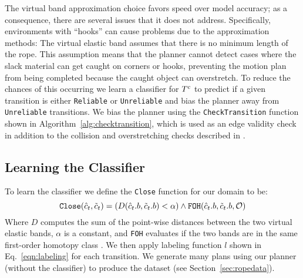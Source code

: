 The virtual band approximation choice favors speed over model accuracy; as a consequence, there are several issues that it does not address. Specifically, environments with ``hooks'' can cause problems due to the approximation methods: The virtual elastic band assumes that there is no minimum length of the rope. This assumption means that the planner cannot detect cases where the slack material can get caught on corners or hooks, preventing the motion plan from being completed because the caught object can overstretch. To reduce the chances of this occurring we learn a classifier for $T^c$ to predict if a given transition is either \texttt{Reliable} or \texttt{Unreliable} and bias the planner away from \texttt{Unreliable} transitions. We bias the planner using the \texttt{CheckTransition} function shown in Algorithm~\ref{alg:checktransition}, which is used as an edge validity check in addition to the collision and overstretching checks described in \cite{McConachie2020}.





\subsection{Learning the Classifier}

To learn the classifier we define the \texttt{Close} function for our domain to be:
$$
\texttt{Close}(\hat {c}_t, \tilde {c}_t) = \left( D(\hat {c}_t.b, \tilde {c}_t.b) < \alpha \right) \land \texttt{FOH}(\hat {c}_t.b, \tilde {c}_t.b,\mathcal{O})
$$
\noindent Where $D$ computes the sum of the point-wise distances between the two virtual elastic bands, $\alpha$ is a constant, and \texttt{FOH} evaluates if the two bands are in the same first-order homotopy class \cite{Jaillet2008}. We then apply labeling function $l$ shown in Eq.~\ref{eqn:labeling} for each transition. We generate many plans using our planner (without the classifier) to produce the dataset (see Section~\ref{sec:ropedata}).



